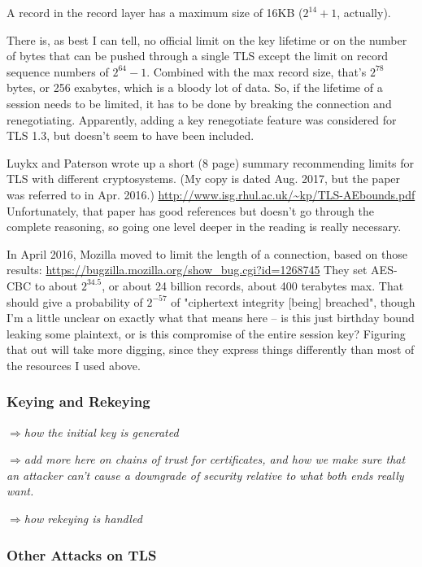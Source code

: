 \documentclass[%
 aip,
 jmp,%
 amsmath,amssymb,
 reprint,%
]{revtex4-1}
\def\comment#1{{\color{ForestGreen}$\Rightarrow${\small\em #1}}}
\begin{document}
A record in the record layer has a maximum size of 16KB ($2^{14}+1$, actually).

There is, as best I can tell, no official limit on the key lifetime or
on the number of bytes that can be pushed through a single TLS except
the limit on record sequence numbers of $2^{64}-1$.  Combined with the
max record size, that's $2^{78}$ bytes, or 256 exabytes, which is a bloody
lot of data.  So, if the lifetime of a session needs to be limited, it
has to be done by breaking the connection and renegotiating.
Apparently, adding a key renegotiate feature was considered for
TLS 1.3, but doesn't seem to have been included.

Luykx and Paterson wrote up a short (8 page) summary recommending
limits for TLS with different cryptosystems. (My copy is dated
Aug. 2017, but the paper was referred to in Apr. 2016.)
\url{http://www.isg.rhul.ac.uk/~kp/TLS-AEbounds.pdf}
Unfortunately, that paper has good references but doesn't go through
the complete reasoning, so going one level deeper in the reading is
really necessary.

In April 2016, Mozilla moved to limit the length of a connection,
based on those results:
\url{https://bugzilla.mozilla.org/show_bug.cgi?id=1268745}
They set AES-CBC to about $2^{34.5}$, or about 24 billion records, about
400 terabytes max.  That should give a probability of $2^{-57}$ of
"ciphertext integrity [being] breached", though I'm a little unclear
on exactly what that means here -- is this just birthday bound leaking
some plaintext, or is this compromise of the entire session key?
Figuring that out will take more digging, since they express things
differently than most of the resources I used above.

\subsubsection{Keying and Rekeying}

\comment{how the initial key is generated}

\comment{add more here on chains of trust for certificates, and how we make
sure that an attacker can't cause a downgrade of security relative to
what both ends really want.}

\comment{how rekeying is handled}

\subsubsection{Other Attacks on TLS}
\end{document}
